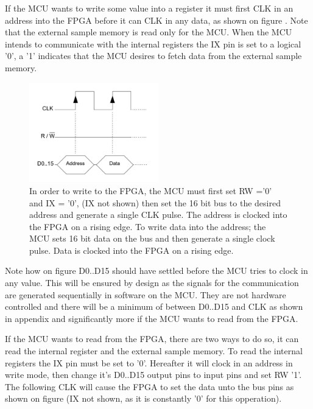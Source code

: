 If the MCU wants to write some value into a register it must first CLK in an address into the FPGA before it can CLK in any data, as shown on figure . Note that the external sample memory is read only for the MCU. When the MCU intends to communicate with the internal registers the IX pin is set to a logical '0', a '1' indicates that the MCU desires to fetch data from the external sample memory.
\begin{figure}[H]
    \centering
    \includegraphics[clip, trim=0 45 0 0, width=0.5\textwidth]{Sections/7_SystemDesign/Figures/7_2_1_CommWrite.pdf}
    \caption{In order to write to the FPGA, the MCU must first set RW ='0' and IX = '0', (IX not shown) then set the 16 bit bus to the desired address and generate a single CLK pulse. The address is clocked into the FPGA on a rising edge. To write data into the address; the MCU sets 16 bit data on the bus and then generate a single clock pulse. Data is clocked into the FPGA on a rising edge.}
    \label{fig_7_2_1_CommWrite}
\end{figure}

Note how on figure  D0..D15 should have settled before the MCU tries to clock in any value. This will be ensured by design as the signals for the communication are generated sequentially in software on the MCU. They are not hardware controlled and there will be a minimum of  between D0..D15 and CLK as shown in appendix  and significantly more if the MCU wants to read from the FPGA.

If the MCU wants to read from the FPGA, there are two ways to do so, it can read the internal register and the external sample memory. To read the internal registers the IX pin must be set to '0'. Hereafter it will clock in an address in write mode, then change it's D0..D15 output pins to input pins and set RW '1'. The following CLK will cause the FPGA to set the data unto the bus pins as shown on figure  (IX not shown, as it is constantly '0' for this opperation). 

